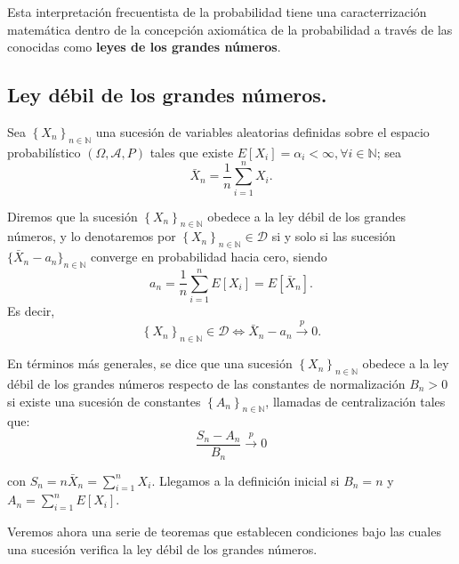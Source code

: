 Esta interpretaci\'on frecuentista de la probabilidad tiene una caracterrizaci\'on matem\'atica dentro de la concepci\'on axiom\'atica de la probabilidad a trav\'es de las conocidas como \textbf{leyes de los grandes n\'umeros}.

\subsection{Ley d\'ebil de los grandes n\'umeros.}

\begin{definicion}
Sea $ \left\{X_n\right\}_{n\in\mathbb{N}}$ una sucesi\'on de variables aleatorias definidas sobre el espacio probabil\'istico $\left(\Omega,\mathcal{A}, P\right) $ tales que existe $E[X_i]=\alpha_i<\infty,\forall i \in\mathbb{N}$; sea
\begin{equation*}
\bar{X}_n=\dfrac{1}{n}\sum_{i=1}^{n}X_i.
\end{equation*}

Diremos que la sucesi\'on $ \left\{X_n\right\}_{n\in\mathbb{N}}$ obedece a la ley d\'ebil de los grandes n\'umeros, y lo denotaremos por $ \left\{X_n\right\}_{n\in\mathbb{N}}\in\mathscr{D}$ si y solo si las sucesi\'on $\{\bar{X}_n-a_n\}_{n\in\mathbb{N}}$ converge en probabilidad hacia cero, siendo 
\begin{equation*}
a_n=\dfrac{1}{n}\sum_{i=1}^{n}E[X_i]=E[\bar{X}_n].
\end{equation*}
Es decir,
\begin{equation*}
\left\{X_n\right\}_{n\in\mathbb{N}}\in\mathscr{D}\Leftrightarrow \bar{X}_n-a_n\overset{p}{\to} 0.
\end{equation*}
\end{definicion}

En t\'erminos m\'as generales, se dice que una sucesi\'on $ \left\{X_n\right\}_{n\in\mathbb{N}}$ obedece a la ley d\'ebil de los grandes n\'umeros respecto de las constantes de normalizaci\'on $B_n>0$ si existe una sucesi\'on de constantes $ \left\{A_n\right\}_{n\in\mathbb{N}}$, llamadas de centralizaci\'on tales que:
\begin{equation*}
\dfrac{S_n-A_n}{B_n}\overset{p}{\to}0
\end{equation*}

con $S_n=n\bar{X}_n=\sum_{i=1}^{n}X_i$. Llegamos a la definici\'on inicial si $B_n=n$ y $A_n=\sum_{i=1}^{n}E[X_i]$.

Veremos ahora una serie de teoremas que establecen condiciones bajo las cuales una sucesi\'on verifica la ley d\'ebil de los grandes n\'umeros.

